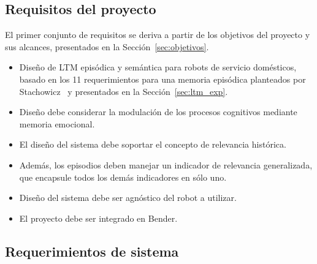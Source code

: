 \subsection{Requisitos del proyecto}

El primer conjunto de requisitos se deriva a partir de los objetivos del proyecto y sus alcances, presentados en la Sección~\ref{sec:objetivos}.
\begin{itemize}
\item {} Diseño de LTM episódica y semántica para robots de servicio domésticos, basado en los 11 requerimientos para una memoria episódica planteados por Stachowicz~\cite{Stachowicz2012} y presentados en la Sección~\ref{sec:ltm_exp}.
\item {} Diseño debe considerar la modulación de los procesos cognitivos mediante memoria emocional.
\item {} El diseño del sistema debe soportar el concepto de relevancia histórica.
\item {} Además, los episodios deben manejar un indicador de relevancia generalizada, que encapsule todos los demás indicadores en sólo uno.
\item {} Diseño del sistema debe ser agnóstico del robot a utilizar.
\item {} El proyecto debe ser integrado en Bender.
\end{itemize}


\subsection{Requerimientos de sistema}


